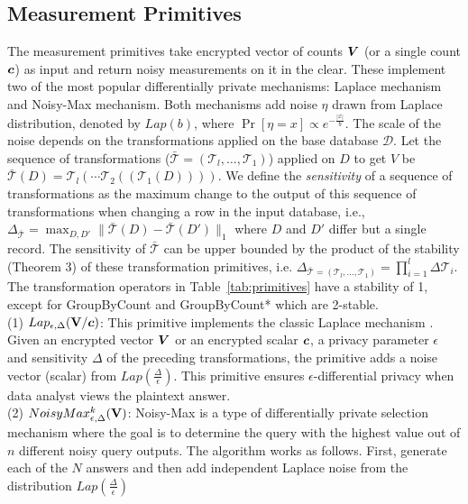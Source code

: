 \subsection{Measurement Primitives} \label{sec:measurement_primitives}
The measurement primitives take encrypted vector of counts $\boldsymbol{V}$ (or a single count $\boldsymbol{c}$) as input and return noisy measurements on it in the clear. These implement two of the most popular differentially private mechanisms: Laplace mechanism and Noisy-Max mechanism.
Both mechanisms add noise $\eta$ drawn from Laplace distribution, denoted by $Lap(b)$, where $\Pr[\eta =x]\propto e^{-{\frac{|x|}{b}}}$. The scale of the noise depends on the transformations applied on the base database $\mathcal{D}$. Let the sequence of transformations ($\bar{\mathcal{T}}=(\mathcal{T}_l,\ldots,\mathcal{T}_1)$) applied on $D$ to get $V$ be $\bar{\mathcal{T}}(D) = \mathcal{T}_l(\cdots \mathcal{T}_2((\mathcal{T}_1(D))))$. We define the \emph{sensitivity} of a sequence of transformations as  the maximum change to the output of this sequence of transformations when changing a row in the input database, i.e.,
$\Delta_{\bar{\mathcal{T}}} = \max_{D,D'} \|\bar{\mathcal{T}}(D)-\bar{\mathcal{T}}(D')\|_1$ where $D$ and $D'$ differ but a single record.
The sensitivity of $\bar{\mathcal{T}}$ can be upper bounded by the product of the stability (Theorem 3) of these transformation primitives, i.e. $\Delta_{\bar{\mathcal{T}}=(\mathcal{T}_l,\ldots,\mathcal{T}_1)} = \prod_{i=1}^l \Delta \mathcal{T}_i$. The transformation operators in Table~\ref{tab:primitives} have a stability of 1, except for \textsf{GroupByCount} and \textsf{GroupByCount*} which are 2-stable. \\
(1) $Lap_{\epsilon,\Delta}(\mathbf{V}/\boldsymbol{c})$:  This primitive implements the classic Laplace mechanism \cite{Dork}. Given an encrypted vector $\boldsymbol{V}$ or an encrypted scalar $\boldsymbol{c}$, a privacy parameter $\epsilon$ and sensitivity $\Delta$ of the preceding transformations, the primitive adds a noise vector (scalar) from $Lap(\frac{\Delta}{\epsilon})$. This primitive ensures $\epsilon$-differential privacy when data analyst views the plaintext answer.\\
(2) $NoisyMax_{\epsilon,\Delta}^k(\mathbf{V})$:  Noisy-Max is a type of differentially private selection mechanism \cite{Dork} where the goal is to determine the query with the highest value out of $n$ different noisy query outputs. The algorithm works as follows. First, generate each of the $N$ answers and then add independent Laplace noise from the distribution $Lap(\frac{\Delta}{\epsilon})$ 
